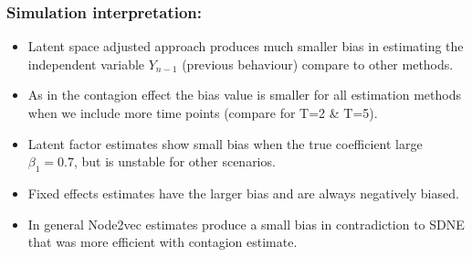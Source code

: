 \documentclass{beamer}
\begin{document}
\begin{frame}
\frametitle{ Simulation interpretation: }
\begin{itemize}
\item Latent space adjusted approach produces much smaller bias in estimating the independent variable $Y_{n-1}$ (previous behaviour) compare to other methods.
\vspace{10pt}
\item As in the contagion effect the bias  value is smaller for all estimation methods when we include more time points (compare for T=2 \& T=5).
\vspace{10pt}

\item Latent factor estimates show small bias when the true coefficient large $\beta_{1}=0.7$, but is unstable for other scenarios.
\vspace{10pt}
\item Fixed effects estimates have the larger bias and are always negatively biased.
\vspace{10pt}
\item In general Node2vec estimates  produce a small bias in contradiction to SDNE that was more efficient with contagion estimate. 
\end{itemize}
\end{frame}
\end{document}
